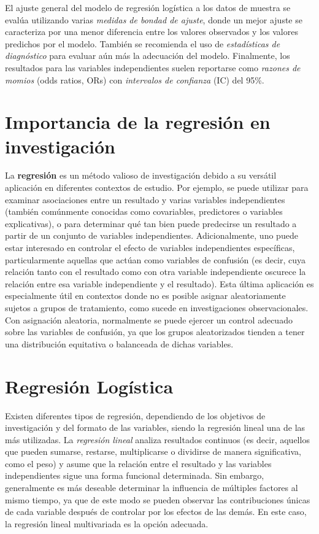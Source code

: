 \documentclass[12pt]{article}
\begin{document}
El ajuste general del modelo de regresi\'on log\'istica a los datos de muestra se eval\'ua utilizando varias \textit{medidas de bondad de ajuste}, donde un mejor ajuste se caracteriza por una menor diferencia entre los valores observados y los valores predichos por el modelo. Tambi\'en se recomienda el uso de \textit{estad\'isticas de diagn\'ostico} para evaluar a\'un m\'as la adecuaci\'on del modelo. Finalmente, los resultados para las variables independientes suelen reportarse como \textit{razones de momios} (odds ratios, ORs) con \textit{intervalos de confianza} (IC) del 95\%.

\section{Importancia de la regresi\'on en investigaci\'on}

La \textbf{regresi\'on} es un m\'etodo valioso de investigaci\'on debido a su vers\'atil aplicaci\'on en diferentes contextos de estudio. Por ejemplo, se puede utilizar para examinar asociaciones entre un resultado y varias variables independientes (tambi\'en com\'unmente conocidas como covariables, predictores o variables explicativas)\cite{darlington1990}, o para determinar qu\'e tan bien puede predecirse un resultado a partir de un conjunto de variables independientes\cite{darlington1990,tabachnick2007}. Adicionalmente, uno puede estar interesado en controlar el efecto de variables independientes espec\'ificas, particularmente aquellas que act\'uan como variables de confusi\'on (es decir, cuya relaci\'on tanto con el resultado como con otra variable independiente oscurece la relaci\'on entre esa variable independiente y el resultado)\cite{darlington1990,hosmer2000}. Esta \'ultima aplicaci\'on es especialmente \'util en contextos donde no es posible asignar aleatoriamente sujetos a grupos de tratamiento, como sucede en investigaciones observacionales. Con asignaci\'on aleatoria, normalmente se puede ejercer un control adecuado sobre las variables de confusi\'on, ya que los grupos aleatorizados tienden a tener una distribuci\'on equitativa o balanceada de dichas variables\cite{campbell1963}.

\section{Regresi\'on Log\'istica}

Existen diferentes tipos de regresi\'on, dependiendo de los objetivos de investigaci\'on y del formato de las variables, siendo la regresi\'on lineal una de las m\'as utilizadas. La \textit{regresi\'on lineal} analiza resultados continuos (es decir, aquellos que pueden sumarse, restarse, multiplicarse o dividirse de manera significativa, como el peso) y asume que la relaci\'on entre el resultado y las variables independientes sigue una forma funcional determinada. Sin embargo, generalmente es m\'as deseable determinar la influencia de m\'ultiples factores al mismo tiempo, ya que de este modo se pueden observar las contribuciones \'unicas de cada variable despu\'es de controlar por los efectos de las dem\'as. En este caso, la regresi\'on lineal multivariada es la opci\'on adecuada.
\end{document}
